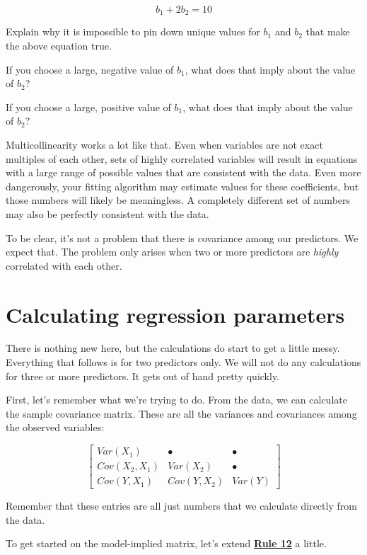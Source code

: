 \documentclass[
]{book}
\begin{document}
\[
b_{1} + 2b_{2} = 10
\]

Explain why it is impossible to pin down unique values for \(b_{1}\) and \(b_{2}\) that make the above equation true.

If you choose a large, negative value of \(b_{1}\), what does that imply about the value of \(b_{2}\)?

If you choose a large, positive value of \(b_{1}\), what does that imply about the value of \(b_{2}\)?

Multicollinearity works a lot like that. Even when variables are not exact multiples of each other, sets of highly correlated variables will result in equations with a large range of possible values that are consistent with the data. Even more dangerously, your fitting algorithm may estimate values for these coefficients, but those numbers will likely be meaningless. A completely different set of numbers may also be perfectly consistent with the data.

To be clear, it's not a problem that there is covariance among our predictors. We expect that. The problem only arises when two or more predictors are \emph{highly} correlated with each other.

\hypertarget{multiple-calculating}{%
\section{Calculating regression parameters}\label{multiple-calculating}}

There is nothing new here, but the calculations do start to get a little messy. Everything that follows is for two predictors only. We will not do any calculations for three or more predictors. It gets out of hand pretty quickly.

First, let's remember what we're trying to do. From the data, we can calculate the sample covariance matrix. These are all the variances and covariances among the observed variables:

\[
\begin{bmatrix}
Var(X_{1})          &   \bullet         &   \bullet \\
Cov(X_{2}, X_{1})   &   Var(X_{2})      &   \bullet \\
Cov(Y, X_{1})       &   Cov(Y, X_{2})   &   Var(Y)
\end{bmatrix}
\]

Remember that these entries are all just numbers that we calculate directly from the data.

To get started on the model-implied matrix, let's extend \href{./covariance.html\#Rule12}{\textbf{Rule 12}} a little.
\end{document}
